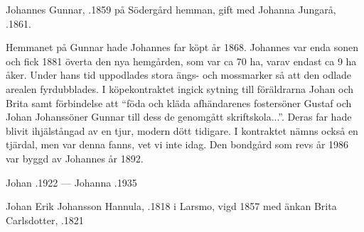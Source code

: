 Johannes Gunnar, .1859 på Södergård hemman, gift med Johanna Jungarå, .1861.
\begin{jhchildren}
  \item {}
  \item {}
  \item {}
  \item {}
  \item {}
  \item {}
  \item {}
  \item {}
  \item {}
  \item {}
  \item {}
  \item {}
\end{jhchildren}

Hemmanet på Gunnar hade Johannes far köpt år 1868. Johannes var enda sonen och fick 1881 överta den nya hemgården, som var ca 70 ha, varav endast ca 9 ha åker. Under hans tid uppodlades stora ängs- och mossmarker så att den odlade arealen fyrdubblades. I köpekontraktet ingick sytning till föräldrarna Johan och Brita samt förbindelse att ``föda och kläda afhändarenes fostersöner Gustaf och Johan Johanssöner Gunnar till dess de genomgått skriftskola...''. Deras far hade blivit ihjälstångad av en tjur, modern dött tidigare. I kontraktet nämns också en tjärdal, men var denna fanns, vet vi inte idag. Den bondgård som revs år 1986 var byggd av Johannes år 1892.

Johan .1922  ---  Johanna .1935


Johan Erik Johansson Hannula, .1818 i Larsmo, vigd 1857 med änkan Brita Carlsdotter, .1821
\begin{jhchildren}
  \item {}
  \item {}
  \item {}
  \item {}
  \item {}
\end{jhchildren}

